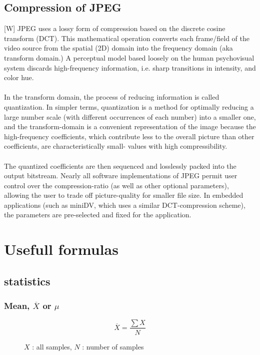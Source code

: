 \documentclass[12pt]{article}
\begin{document}
    \subsection{Compression of JPEG}
    [W] JPEG uses a lossy form of compression based on the discrete cosine 
    transform (DCT). This mathematical operation converts each frame/field 
    of the video source from the spatial (2D) domain into the frequency 
    domain (aka transform domain.) A perceptual model based loosely on the 
    human psychovisual system discards high-frequency information, i.e. 
    sharp transitions in intensity, and color hue. \\
    \\
    In the transform domain, 
    the process of reducing information is called quantization. In simpler 
    terms, quantization is a method for optimally reducing a large number 
    scale (with different occurrences of each number) into a smaller one, 
    and the transform-domain is a convenient representation of the image 
    because the high-frequency coefficients, which contribute less to the 
    overall picture than other coefficients, are characteristically small-
    values with high compressibility.\\
    \\
    The quantized coefficients are then 
    sequenced and losslessly packed into the output bitstream. Nearly all 
    software implementations of JPEG permit user control over the 
    compression-ratio (as well as other optional parameters), allowing the 
    user to trade off picture-quality for smaller file size. In embedded 
    applications (such as miniDV, which uses a similar DCT-compression 
    scheme), the parameters are pre-selected and fixed for the application.
%	
%	
\section{Usefull formulas}
    \subsection{statistics}
        \subsubsection*{Mean, $\overline{X}$ or $\mu$}
            \begin{figure}
\[ \overline{X} = \frac{\sum{X}}{N} \]
\caption{$X$ : all samples, $N$ : number of samples}
\end{figure}
            \
            
\end{document}
